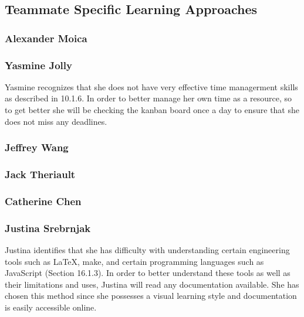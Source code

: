 \documentclass[12pt]{article}
\begin{document}
\subsection{Teammate Specific Learning Approaches}
\subsubsection{Alexander Moica}
\subsubsection{Yasmine Jolly}
Yasmine recognizes that she does not have very effective time managerment skills as described in 10.1.6. In order to better manage her own time as a resource, so to get better  she will be checking the kanban board once a day to ensure that she does not miss any deadlines. 
\subsubsection{Jeffrey Wang}
\subsubsection{Jack Theriault}
\subsubsection{Catherine Chen}
\subsubsection{Justina Srebrnjak}
Justina identifies that she has difficulty with understanding certain engineering tools such as \LaTeX, make, and certain programming languages such as JavaScript (Section 16.1.3). In order to better understand these tools as well as their limitations and uses, Justina will read any documentation available. She has chosen this method since she possesses a visual learning style and documentation is easily accessible online.
\end{document}
